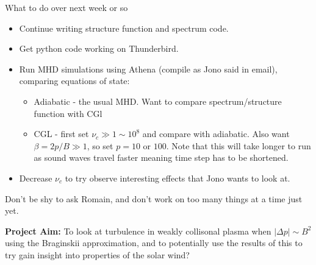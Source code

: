 \documentclass[12pt,letterpaper]{article}
\begin{document}
What to do over next week or so
\begin{itemize}
  \item Continue writing structure function and spectrum code.
  \item Get python code working on Thunderbird.
  \item Run MHD simulations using Athena (compile as Jono said in email), comparing equations of state:
  \begin{itemize}
    \item Adiabatic - the usual MHD. Want to compare spectrum/structure function with CGl
    \item CGL - first set $\nu_c\gg 1 \sim 10^8$ and compare with adiabatic. Also want $\beta=2p/B\gg 1$, so set $p=10$ or $100$. Note that this will take longer to run as sound waves travel faster meaning time step has to be shortened.
  \end{itemize}
  \item Decrease $\nu_c$ to try observe interesting effects that Jono wants to look at.
\end{itemize}
Don't be shy to ask Romain, and don't work on too many things at a time just yet.

\textbf{Project Aim:} To look at turbulence in weakly collisonal plasma when $|\Delta p|\sim B^2$ using the Braginskii approximation, and to potentially use the results of this to try gain insight into properties of the solar wind?
\end{document}
